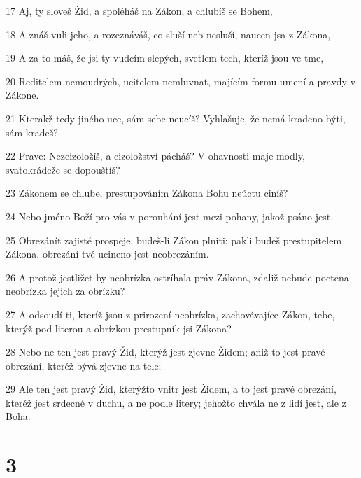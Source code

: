 \par 17 Aj, ty sloveš Žid, a spoléháš na Zákon, a chlubíš se Bohem,
\par 18 A znáš vuli jeho, a rozeznáváš, co sluší neb nesluší, naucen jsa z Zákona,
\par 19 A za to máš, že jsi ty vudcím slepých, svetlem tech, kteríž jsou ve tme,
\par 20 Reditelem nemoudrých, ucitelem nemluvnat, majícím formu umení a pravdy v Zákone.
\par 21 Kterakž tedy jiného uce, sám sebe neucíš? Vyhlašuje, že nemá kradeno býti, sám kradeš?
\par 22 Prave: Nezcizoložíš, a cizoložství pácháš? V ohavnosti maje modly, svatokrádeže se dopouštíš?
\par 23 Zákonem se chlube, prestupováním Zákona Bohu neúctu ciníš?
\par 24 Nebo jméno Boží pro vás v porouhání jest mezi pohany, jakož psáno jest.
\par 25 Obrezánít zajisté prospeje, budeš-li Zákon plniti; pakli budeš prestupitelem Zákona, obrezání tvé ucineno jest neobrezáním.
\par 26 A protož jestližet by neobrízka ostríhala práv Zákona, zdaliž nebude poctena neobrízka jejich za obrízku?
\par 27 A odsoudí ti, kteríž jsou z prirození neobrízka, zachovávajíce Zákon, tebe, kterýž pod literou a obrízkou prestupník jsi Zákona?
\par 28 Nebo ne ten jest pravý Žid, kterýž jest zjevne Židem; aniž to jest pravé obrezání, kteréž bývá zjevne na tele;
\par 29 Ale ten jest pravý Žid, kterýžto vnitr jest Židem, a to jest pravé obrezání, kteréž jest srdecné v duchu, a ne podle litery; jehožto chvála ne z lidí jest, ale z Boha.

\chapter{3}

